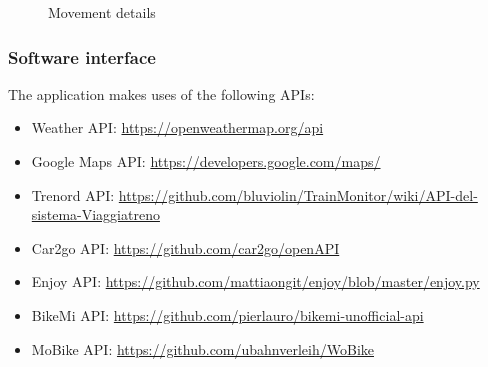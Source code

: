 \clearpage
\begin{figure}[!h]
	\centering
	\begin{minipage}[b]{0.65\textwidth}
		\caption{Movement details}
	\end{minipage}
\end{figure}
\clearpage

\subsubsection{Software interface}
The application makes uses of the following APIs:
\begin{itemize}
	\item Weather API: \href{url}{https://openweathermap.org/api}
	\item Google Maps API: \href{url}{https://developers.google.com/maps/}
	\item Trenord API: \href{url}{https://github.com/bluviolin/TrainMonitor/wiki/API-del-sistema-Viaggiatreno}
	\item Car2go API: \href{url}{https://github.com/car2go/openAPI}
	\item Enjoy API: \href{url}{https://github.com/mattiaongit/enjoy/blob/master/enjoy.py}
	\item BikeMi API: \href{url}{https://github.com/pierlauro/bikemi-unofficial-api}
	\item MoBike API: \href{url}{https://github.com/ubahnverleih/WoBike}
\end{itemize}
